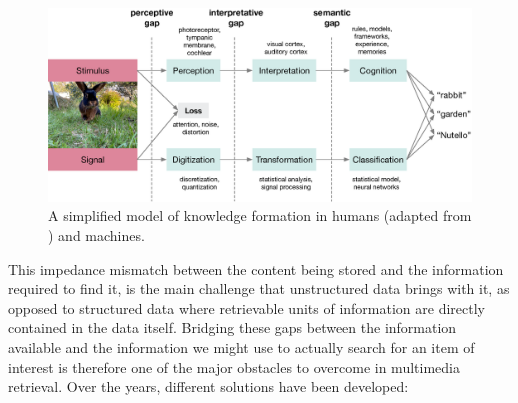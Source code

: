 \begin{figure}[tb]
    \centering
    \includegraphics[width=\textwidth]{figures/gaps.eps}
    \caption{A simplified model of knowledge formation in humans (adapted from \cite{Javanmardi:2021Exploring}) and machines.}
    \label{figure:knowledge_formation}
\end{figure}

This impedance mismatch between the content being stored and the information required to find it, is the main challenge that unstructured data brings with it, as opposed to structured data where retrievable units of information are directly contained in the data itself. Bridging these gaps between the information available and the information we might use to actually search for an item of interest is therefore one of the major obstacles to overcome in multimedia retrieval. Over the years, different solutions have been developed:

